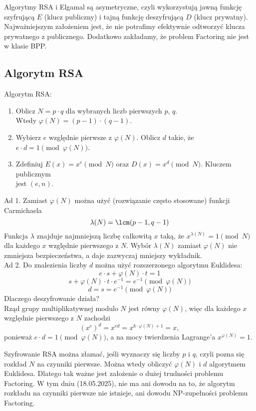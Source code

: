 Algorytmy RSA i Elgamal są asymetryczne, czyli wykorzystują jawną funkcję szyfrującą \( E \) (klucz publiczny) i tajną funkcję deszyfrującą \( D \) (klucz prywatny).
Najważniejszym założeniem jest, że nie potrafimy efektywnie odtworzyć klucza prywatnego z publicznego. Dodatkowo zakładamy, że problem Factoring nie jest w klasie BPP.

\subsection{Algorytm RSA}
\begin{greyframe}
    Algorytm RSA:
    \begin{enumerate}
        \item Oblicz \( N = p \cdot q \) dla wybranych liczb pierwszych \( p \), \( q \). \\
        Wtedy \( \varphi(N) = (p-1) \cdot (q-1) \).
        \item Wybierz \( e \) względnie pierwsze z \( \varphi(N) \). Oblicz \( d \) takie, że  \( e\cdot d = 1 \pmod{\varphi(N)} \).
        \item Zdefiniuj \( E(x) = x^e \pmod{N} \) oraz \( D(x) = x^d \pmod{N} \). Kluczem publicznym \\ jest \( (e, n) \).
    \end{enumerate}
\end{greyframe}

Ad 1. Zamiast \( \varphi(N) \) można użyć (rozwiązanie często stosowane) funkcji Carmichaela
\[
    \lambda(N) = \lcm(p - 1, q - 1)
\]
Funkcja \( \lambda \) znajduje najmniejszą liczbę całkowitą \( x \) taką, że \( x^{\lambda(N)} = 1 \pmod{N} \) dla każdego \( x \) względnie pierwszego z \( N \).
Wybór \( \lambda(N) \) zamiast \( \varphi(N) \) nie zmniejsza bezpieczeństwa, a daje zazwyczaj mniejszy wykładnik. \\
Ad 2. Do znalezienia liczby \( d \) można użyć rozszerzonego algorytmu Euklidesa:
\[
    e \cdot s + \varphi(N) \cdot t = 1
\]
\[
    s + \varphi(N) \cdot t \cdot e^{-1} = e^{-1} \pmod{\varphi(N)}
\]
\[
    d = s = e^{-1} \pmod{\varphi(N)}
\]
Dlaczego deszyfrowanie działa? \\
Rząd grupy multiplikatywnej modulo \( N \) jest równy \( \varphi(N) \), więc dla każdego \( x \) względnie pierwszego z \( N \) zachodzi
\[
    (x^{e})^d = x^{ed} = x^{k \cdot \varphi(N) + 1} = x,
\]
ponieważ \( e \cdot d = 1 \pmod{\varphi(N)} \), a na mocy twierdzenia Lagrange'a \( x^{\varphi(N)} = 1 \).

Szyfrowanie RSA można złamać, jeśli wyznaczy się liczby \( p \) i \( q \), czyli pozna się rozkład \( N \) na czynniki pierwsze.
Można wtedy obliczyć \( \varphi(N) \) i \( d \) algorytmem Euklidesa. Dlatego tak ważne jest założenie o dużej trudności problemu Factoring.
W tym dniu (18.05.2025), nie ma ani dowodu na to, że algorytm rozkładu na czynniki pierwsze nie istnieje, ani dowodu NP-zupełności problemu Factoring.

